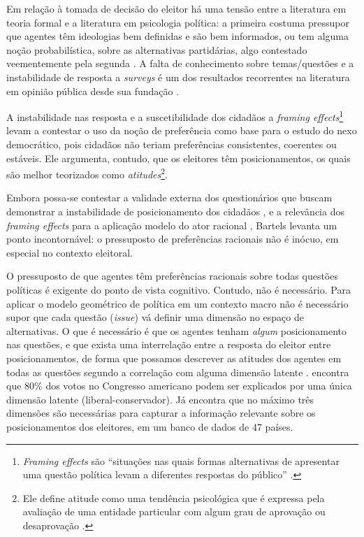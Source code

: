 Em relação à tomada de decisão do eleitor há uma tensão entre a literatura em
teoria formal e a literatura em psicologia política: a primeira costuma
pressupor que agentes têm ideologias bem definidas e são bem informados, ou tem
alguma noção probabilística, sobre as alternativas partidárias, algo contestado
veementemente pela segunda \cite[p.5]{bendor2011behavioral}. A falta de
conhecimento sobre temas/questões e a instabilidade de resposta a
\textit{surveys} é um dos resultados recorrentes na literatura em opinião
pública desde sua fundação \cite{berelson1952democratic, converse2006nature,
  zaller1992simple, kuklinski2000misinformation}.

A instabilidade nas resposta e a suscetibilidade dos cidadãos a \textit{framing
  effects}\footnote{\textit{Framing effects} são ``situações nas quais formas
  alternativas de apresentar uma questão política levam a diferentes respostas
  do público'' \cite[p.56]{bartels2003democracy}.} levam
 a contestar o uso da noção de preferência como
base para o estudo do nexo democrático, pois cidadãos não teriam preferências
consistentes, coerentes ou estáveis. Ele argumenta, contudo, que os eleitores
têm posicionamentos, os quais são melhor teorizados como
\textit{atitudes}\footnote{ Ele define atitude como uma tendência psicológica
  que é expressa pela avaliação de uma entidade particular com algum grau de
  aprovação ou desaprovação \cite[p.52]{bartels2003democracy}.}.

Embora possa-se contestar a validade externa dos questionários que buscam
demonstrar a instabilidade de posicionamento dos cidadãos
\cite{druckman2012public}, e a relevância dos \textit{framing effects} para a
aplicação modelo do ator racional \cite[p. 107]{gintis2016individuality},
Bartels levanta um ponto incontornável: o pressuposto de preferências racionais
não é inócuo, em especial no contexto eleitoral.

O pressuposto de que agentes têm preferências racionais sobre todas questões
políticas é exigente do ponto de vista cognitivo. Contudo, não é necessário.
Para aplicar o modelo geométrico de política em um contexto macro não é
necessário supor que cada questão (\textit{issue}) vá definir uma dimensão no
espaço de alternativas. O que é necessário é que os agentes tenham
\textit{algum} posicionamento nas questões, e que exista uma interrelação entre
a resposta do eleitor entre posicionamentos, de forma que possamos descrever as
atitudes dos agentes em todas as questões segundo a correlação com alguma
dimensão latente \cite{poole2005spatial,laver2014measuring}.
 encontra que $80\%$ dos votos no Congresso
americano podem ser explicados por uma única dimensão latente
(liberal-conservador). Já  encontra que no máximo
três dimensões são necessárias para capturar a informação relevante sobre os
posicionamentos dos eleitores, em um banco de dados de 47 países.

